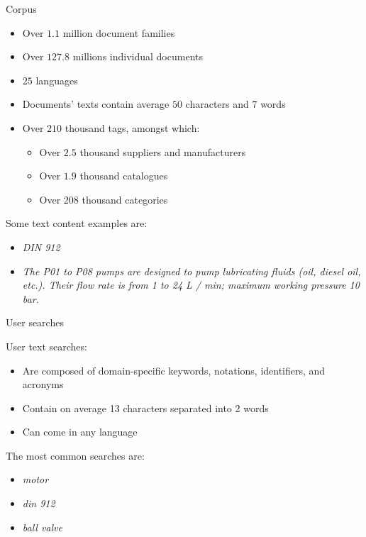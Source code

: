 \begin{frame}{Corpus}
    
    \begin{itemize}
        \item Over $1.1$ million document families
        \item Over $127.8$ millions individual documents
        \item $25$ languages
        \item Documents' texts contain average $50$ characters and $7$ words
        \item Over $210$ thousand tags, amongst which:
        \begin{itemize}
            \item Over $2.5$ thousand suppliers and manufacturers
            \item Over $1.9$ thousand catalogues
            \item Over $208$ thousand categories
        \end{itemize}
    \end{itemize}

    Some text content examples are:
    \begin{itemize}
        \item \emph{DIN 912}
        \item \emph{The P01 to P08 pumps are designed to pump lubricating fluids (oil, diesel oil, etc.). Their flow rate is from 1 to 24 L / min; maximum working pressure 10 bar.} 
    \end{itemize}

\end{frame}

\begin{frame}{User searches}
    
    User text searches:
    \begin{itemize}
        \item Are composed of domain-specific keywords, notations, identifiers, and
        acronyms
        \item Contain on average 13 characters separated into 2 words
        \item Can come in any language
    \end{itemize}

    The most common searches are:
    \begin{itemize}
        \item \emph{motor}
        \item \emph{din 912}
        \item \emph{ball valve}
    \end{itemize}

\end{frame}


